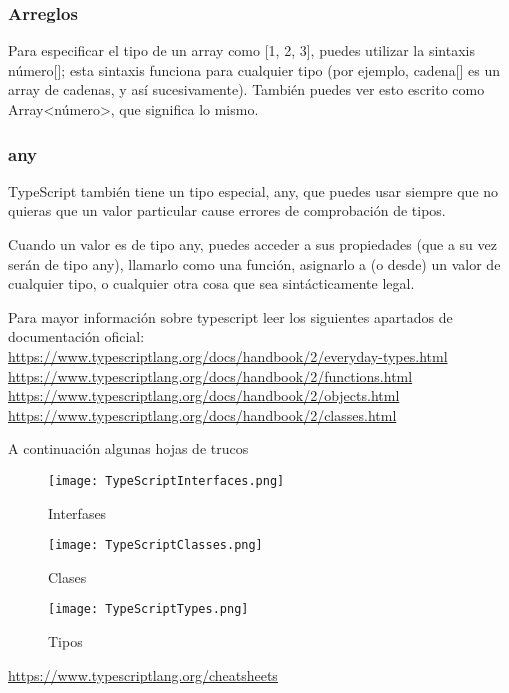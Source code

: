 \begin{enumerate}
\subsubsection{Arreglos}

Para especificar el tipo de un array como [1, 2, 3], puedes utilizar la sintaxis número[]; esta sintaxis funciona para cualquier tipo (por ejemplo, cadena[] es un array de cadenas, y así sucesivamente). También puedes ver esto escrito como Array<número>, que significa lo mismo.

\subsubsection{any}

TypeScript también tiene un tipo especial, any, que puedes usar siempre que no quieras que un valor particular cause errores de comprobación de tipos.

Cuando un valor es de tipo any, puedes acceder a sus propiedades (que a su vez serán de tipo any), llamarlo como una función, asignarlo a (o desde) un valor de cualquier tipo, o cualquier otra cosa que sea sintácticamente legal.

Para mayor información sobre typescript leer los siguientes apartados de documentación oficial:
\url{https://www.typescriptlang.org/docs/handbook/2/everyday-types.html}
\\
\url{https://www.typescriptlang.org/docs/handbook/2/functions.html}
\\
\url{https://www.typescriptlang.org/docs/handbook/2/objects.html}
\\
\url{https://www.typescriptlang.org/docs/handbook/2/classes.html}

A continuación algunas hojas de trucos

\begin{figure}[H]
	\center
	\texttt{[image: TypeScriptInterfaces.png]}
	\caption{Interfases}
\end{figure}

\begin{figure}[H]
	\center
	\texttt{[image: TypeScriptClasses.png]}
	\caption{Clases}
\end{figure}

\begin{figure}[H]
	\center
	\texttt{[image: TypeScriptTypes.png]}
	\caption{Tipos}
\end{figure}

\url{https://www.typescriptlang.org/cheatsheets}


\end{enumerate}

